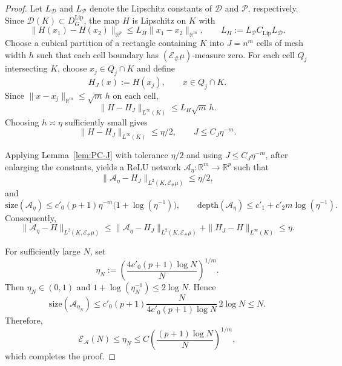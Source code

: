 \documentclass{article}
\numberwithin{equation}{section}
\theoremstyle{plain}
\begin{document}
	\begin{proof}
		Let $L_{\mathcal D}$ and $L_{\mathcal P}$ denote the Lipschitz constants of $\mathcal D$ and $\mathcal P$, respectively. Since $\mathcal D(K)\subset D_G^{\mathrm{Lip}}$, the map $H$ is Lipschitz on $K$ with
		\begin{equation*}
			\|H(x_1)-H(x_2)\|_{\mathbb R^p}
			\le
			L_H\|x_1-x_2\|_{\mathbb R^m},
			\qquad
			L_H:=L_{\mathcal P}C_{\mathrm{Lip}}L_{\mathcal D}.
		\end{equation*}
		Choose a cubical partition of a rectangle containing $K$ into $J=n^m$ cells of mesh width $h$ such that each cell boundary has $(\mathcal E_\#\mu)$-measure zero. For each cell $Q_j$ intersecting $K$, choose $x_j\in Q_j\cap K$ and define
		\begin{equation*}
			H_J(x):=H(x_j),
			\qquad x\in Q_j\cap K.
		\end{equation*}
		Since $\|x-x_j\|_{\mathbb R^m}\le\sqrt m\,h$ on each cell,
		\begin{equation*}
			\|H-H_J\|_{L^\infty(K)}
			\le L_H\sqrt m\,h.
		\end{equation*}
		Choosing $h\asymp\eta$ sufficiently small gives
		\begin{equation*}
			\|H-H_J\|_{L^\infty(K)}\le\eta/2,
			\qquad
			J\le C_J\eta^{-m}.
		\end{equation*}
		
		Applying Lemma~\ref{lem:PC-J} with tolerance $\eta/2$ and using
		$J\le C_J\eta^{-m}$, after enlarging the constants, yields a ReLU
		network $\mathcal A_\eta:\mathbb R^m\to\mathbb R^p$ such that
		\begin{equation*}
			\|\mathcal A_\eta-H_J\|_{L^2(K,\mathcal E_\#\mu)}
			\le\eta/2,
		\end{equation*}
		and
		\begin{equation*}
			\mathrm{size}(\mathcal A_\eta)
			\le
			c'_0(p+1)\eta^{-m}\bigl(1+\log(\eta^{-1})\bigr),
			\qquad
			\mathrm{depth}(\mathcal A_\eta)
			\le
			c'_1+c'_2m\log(\eta^{-1}).
		\end{equation*}
		Consequently,
		\begin{equation*}
			\|\mathcal A_\eta-H\|_{L^2(K,\mathcal E_\#\mu)}
			\le
			\|\mathcal A_\eta-H_J\|_{L^2(K,\mathcal E_\#\mu)}
			+
			\|H_J-H\|_{L^\infty(K)}
			\le\eta.
		\end{equation*}
		
		For sufficiently large $N$, set
		\begin{equation*}
			\eta_N
			:=
			\left(
			\frac{4c'_0(p+1)\log N}{N}
			\right)^{1/m}.
		\end{equation*}
		Then $\eta_N\in(0,1)$ and
		$1+\log(\eta_N^{-1})\le2\log N$. Hence
		\begin{equation*}
			\mathrm{size}(\mathcal A_{\eta_N})
			\le
			c'_0(p+1)
			\frac{N}{4c'_0(p+1)\log N}
			\,2\log N
			\le N.
		\end{equation*}
		Therefore,
		\begin{equation*}
			\mathscr E_{\mathcal A}(N)
			\le\eta_N
			\le
			C\left(
			\frac{(p+1)\log N}{N}
			\right)^{1/m},
		\end{equation*}
		which completes the proof.
	\end{proof}
\end{document}
